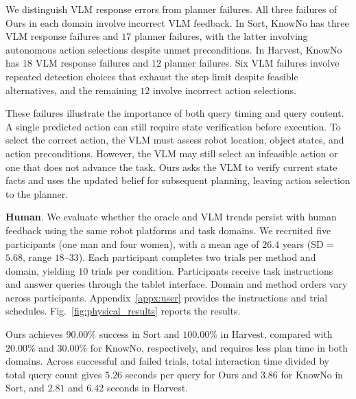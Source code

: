 We distinguish VLM response errors from planner failures. All three failures of Ours in each domain involve incorrect VLM feedback. In Sort, KnowNo has three VLM response failures and $17$ planner failures, with the latter involving autonomous action selections despite unmet preconditions. In Harvest, KnowNo has $18$ VLM response failures and $12$ planner failures. Six VLM failures involve repeated detection choices that exhaust the step limit despite feasible alternatives, and the remaining $12$ involve incorrect action selections.

These failures illustrate the importance of both query timing and query content. A single predicted action can still require state verification before execution. To select the correct action, the VLM must assess robot location, object states, and action preconditions. However, the VLM may still select an infeasible action or one that does not advance the task. Ours asks the VLM to verify current state facts and uses the updated belief for subsequent planning, leaving action selection to the planner.













\vspace{10pt}
\noindent\textbf{Human}\label{exp:human_eval}. 
We evaluate whether the oracle and VLM trends persist with human feedback using the same robot platforms and task domains. We recruited five participants (one man and four women), with a mean age of $26.4$ years (SD = $5.68$, range $18$--$33$). Each participant completes two trials per method and domain, yielding $10$ trials per condition. Participants receive task instructions and answer queries through the tablet interface. Domain and method orders vary across participants. Appendix~\ref{appx:user} provides the instructions and trial schedules. Fig.~\ref{fig:physical_results} reports the results.


Ours achieves $90.00\%$ success in Sort and $100.00\%$ in Harvest, compared with $20.00\%$ and $30.00\%$ for KnowNo, respectively, and requires less plan time in both domains. Across successful and failed trials, total interaction time divided by total query count gives $5.26$ seconds per query for Ours and $3.86$ for KnowNo in Sort, and $2.81$ and $6.42$ seconds in Harvest.


